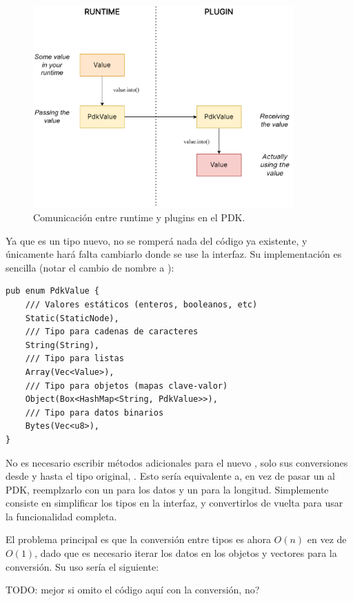 \begin{figure}
    \centering
    \includegraphics[width=10cm]{./Imagenes/simplify.pdf}
    \caption{Comunicación entre runtime y plugins en el PDK.}%
    \label{fig:simplify}
\end{figure}

Ya que es un tipo nuevo, no se romperá nada del código ya existente, y
únicamente hará falta cambiarlo donde se use la interfaz. Su implementación es
sencilla (notar el cambio de nombre a ):

\begin{verbatim}
pub enum PdkValue {
    /// Valores estáticos (enteros, booleanos, etc)
    Static(StaticNode),
    /// Tipo para cadenas de caracteres
    String(String),
    /// Tipo para listas
    Array(Vec<Value>),
    /// Tipo para objetos (mapas clave-valor)
    Object(Box<HashMap<String, PdkValue>>),
    /// Tipo para datos binarios
    Bytes(Vec<u8>),
}
\end{verbatim}

No es necesario escribir métodos adicionales para el nuevo , solo
sus conversiones desde y hasta el tipo original, . Esto sería
equivalente a, en vez de pasar un  al PDK, reemplzarlo con un
 para los datos y un  para la longitud. Simplemente
consiste en simplificar los tipos en la interfaz, y convertirlos de vuelta para
usar la funcionalidad completa.

El problema principal es que la conversión entre tipos es ahora $O(n)$ en vez de
$O(1)$, dado que es necesario iterar los datos en los objetos y vectores para la
conversión. Su uso sería el siguiente:

TODO: mejor si omito el código aquí con la conversión, no?

